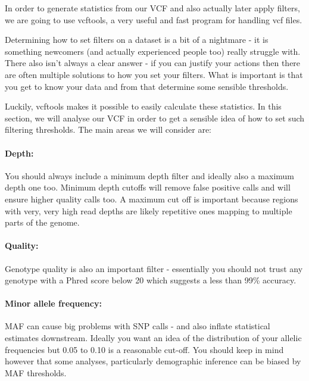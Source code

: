 \documentclass[
]{article}
\begin{document}
In order to generate statistics from our VCF and also actually later
apply filters, we are going to use vcftools, a very useful and fast
program for handling vcf files.

Determining how to set filters on a dataset is a bit of a nightmare - it
is something newcomers (and actually experienced people too) really
struggle with. There also isn't always a clear answer - if you can
justify your actions then there are often multiple solutions to how you
set your filters. What is important is that you get to know your data
and from that determine some sensible thresholds.

Luckily, vcftools makes it possible to easily calculate these
statistics. In this section, we will analyse our VCF in order to get a
sensible idea of how to set such filtering thresholds. The main areas we
will consider are:

\hypertarget{depth}{%
\paragraph{Depth:}\label{depth}}

You should always include a minimum depth filter and ideally also a
maximum depth one too. Minimum depth cutoffs will remove false positive
calls and will ensure higher quality calls too. A maximum cut off is
important because regions with very, very high read depths are likely
repetitive ones mapping to multiple parts of the genome.

\hypertarget{quality}{%
\paragraph{Quality:}\label{quality}}

Genotype quality is also an important filter - essentially you should
not trust any genotype with a Phred score below 20 which suggests a less
than 99\% accuracy.

\hypertarget{minor-allele-frequency}{%
\paragraph{Minor allele frequency:}\label{minor-allele-frequency}}

MAF can cause big problems with SNP calls - and also inflate statistical
estimates downstream. Ideally you want an idea of the distribution of
your allelic frequencies but 0.05 to 0.10 is a reasonable cut-off. You
should keep in mind however that some analyses, particularly demographic
inference can be biased by MAF thresholds.
\end{document}
